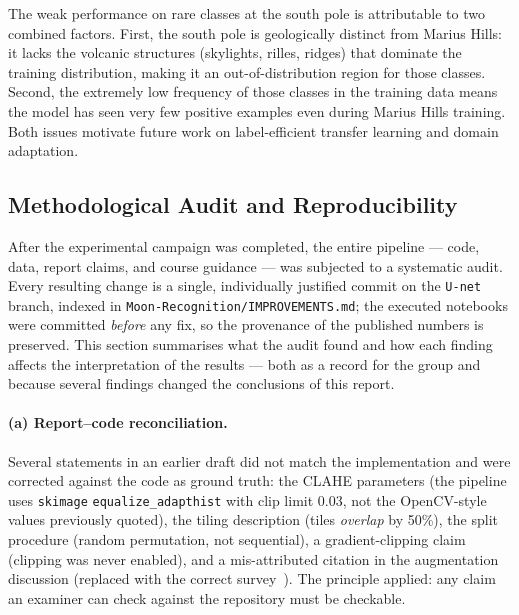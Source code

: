 The weak performance on rare classes at the south pole is attributable to two combined factors. First, the south pole is geologically distinct from Marius Hills: it lacks the volcanic structures (skylights, rilles, ridges) that dominate the training distribution, making it an out-of-distribution region for those classes. Second, the extremely low frequency of those classes in the training data means the model has seen very few positive examples even during Marius Hills training. Both issues motivate future work on label-efficient transfer learning and domain adaptation.

\subsection{Methodological Audit and Reproducibility}
\label{sec:mr_audit}

After the experimental campaign was completed, the entire pipeline — code, data, report claims, and course guidance — was subjected to a systematic audit. Every resulting change is a single, individually justified commit on the \texttt{U-net} branch, indexed in \texttt{Moon-Recognition/IMPROVEMENTS.md}; the executed notebooks were committed \emph{before} any fix, so the provenance of the published numbers is preserved. This section summarises what the audit found and how each finding affects the interpretation of the results — both as a record for the group and because several findings changed the conclusions of this report.

\paragraph{(a) Report--code reconciliation.}
Several statements in an earlier draft did not match the implementation and were corrected against the code as ground truth: the CLAHE parameters (the pipeline uses \texttt{skimage} \texttt{equalize\_adapthist} with clip limit 0.03, not the OpenCV-style values previously quoted), the tiling description (tiles \emph{overlap} by 50\%), the split procedure (random permutation, not sequential), a gradient-clipping claim (clipping was never enabled), and a mis-attributed citation in the augmentation discussion (replaced with the correct survey~\cite{shorten2019augmentation}). The principle applied: any claim an examiner can check against the repository must be checkable.

